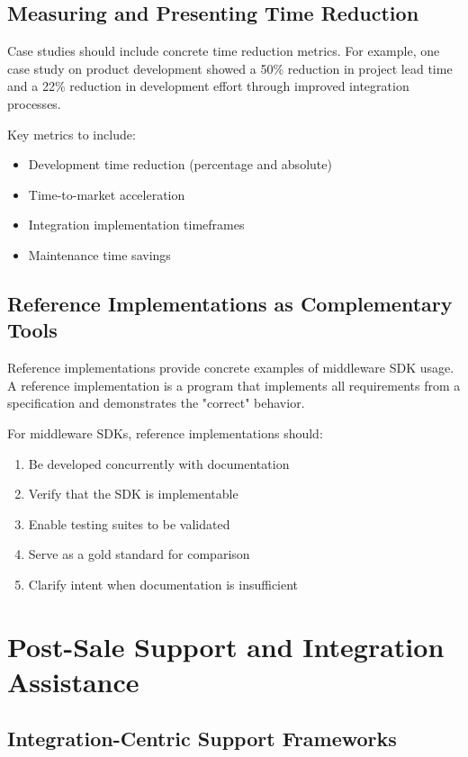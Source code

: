 \documentclass[11pt,a4paper]{article}
\begin{document}
\subsection{Measuring and Presenting Time Reduction}

Case studies should include concrete time reduction metrics. For example, one case study on product development showed a 50\% reduction in project lead time and a 22\% reduction in development effort through improved integration processes.

Key metrics to include:
\begin{itemize}
    \item Development time reduction (percentage and absolute)
    \item Time-to-market acceleration
    \item Integration implementation timeframes
    \item Maintenance time savings
\end{itemize}

\subsection{Reference Implementations as Complementary Tools}

Reference implementations provide concrete examples of middleware SDK usage. A reference implementation is a program that implements all requirements from a specification and demonstrates the "correct" behavior.

For middleware SDKs, reference implementations should:
\begin{enumerate}
    \item Be developed concurrently with documentation
    \item Verify that the SDK is implementable
    \item Enable testing suites to be validated
    \item Serve as a gold standard for comparison
    \item Clarify intent when documentation is insufficient
\end{enumerate}

\section{Post-Sale Support and Integration Assistance}

\subsection{Integration-Centric Support Frameworks}
\end{document}
